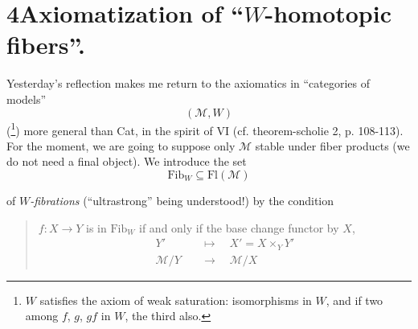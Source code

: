 \section*{4\quad Axiomatization of ``$W$-homotopic fibers''.}

Yesterday's reflection makes me return to the axiomatics in ``categories of models'' %
\[
(\mathcal{M}, W)
\]
(\footnote[119]{$W$ satisfies the axiom of weak saturation: isomorphisms in $W$, and if two among $f$, $g$, $gf$ in $W$, the third also.}) more general than Cat, in the spirit of VI (cf. theorem-scholie 2, p. 108-113). For the moment, we are going to suppose only $\mathcal{M}$ stable under fiber products (we do not need a final object). We introduce the set
\[
\mathrm{Fib}_W \subseteq \mathrm{Fl}(\mathcal{M})
\]

of \textit{$W$-fibrations} (``ultrastrong'' being understood!) by the condition

\begin{quote}
$f : X \longrightarrow Y$ is in $\mathrm{Fib}_W$ if and only if the base change functor by $X$,
\[
\begin{aligned}
Y' &\quad\longmapsto\quad X' = X \times_Y Y' \\
\mathcal{M}/Y &\quad\longrightarrow\quad \mathcal{M}/X
\end{aligned}
\]
\end{quote}